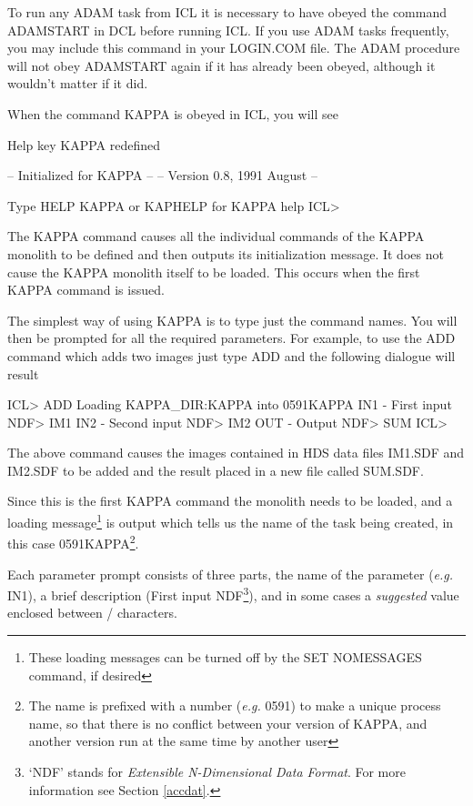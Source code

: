 \documentclass[twoside,11pt,nolof,chapters]{starlink}
\begin{document}
To run any ADAM task from ICL it is necessary to have obeyed the command
ADAMSTART in DCL before running ICL.
If you use ADAM tasks frequently, you may include this command in your
LOGIN.COM file. The ADAM procedure will not obey ADAMSTART again if it has
already been obeyed, although it wouldn't matter if it did.

When the command KAPPA is obeyed in ICL, you will see

\begin{terminalv}
     Help key KAPPA redefined

     --    Initialized for KAPPA   --
     --   Version 0.8, 1991 August --

        Type HELP KAPPA or KAPHELP for KAPPA help
    ICL>
\end{terminalv}

The KAPPA command causes all the individual commands of the KAPPA monolith
to be defined and then outputs its initialization message. It does not cause
the KAPPA monolith itself to be loaded. This occurs when the first KAPPA
command is issued.

The simplest way of using KAPPA is to type just the command names. You will
then be prompted for all the required parameters. For example, to use the
ADD command which adds two images just type ADD and the following dialogue
will result

\begin{terminalv}
    ICL> ADD
    Loading KAPPA_DIR:KAPPA into 0591KAPPA
    IN1 - First input NDF> IM1
    IN2 - Second input NDF> IM2
    OUT - Output NDF> SUM
    ICL>
\end{terminalv}

The above command causes the images contained in HDS data files IM1.SDF
and IM2.SDF to be added and the result placed in a new file called SUM.SDF.

Since this is the first KAPPA command the monolith needs to be loaded, and a
loading message\footnote{These loading messages can be turned off by the SET
NOMESSAGES command, if desired} is output which tells us the name of the task
being created, in this case 0591KAPPA\footnote{The name is prefixed with a
number (\emph{e.g.} 0591) to make a unique process name, so that there is no conflict
between your version of KAPPA, and another version run at the same time by
another user}.

Each parameter prompt consists of three parts, the name of the
parameter (\emph{e.g.} IN1), a brief description (First input NDF\footnote{
`NDF' stands for \emph{Extensible N-Dimensional Data Format}. For more
information see Section \ref{accdat}.}), and in some
cases a \emph{suggested} value enclosed between / characters.
\end{document}
